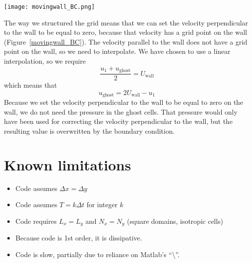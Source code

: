 \documentclass[12pt]{article}
\begin{document}
\begin{center}
\begin{figure*}
\center
\texttt{[image: movingwall\_BC.png]} 
\caption{Schematic of moving wall boundary condition interpolation.}
\label{movingwall_BC}
\end{figure*}
\end{center}

The way we structured the grid means that we can set the velocity perpendicular to the wall to be equal to zero, because that velocity has a grid point on the wall (Figure~\ref{movingwall_BC}).  The velocity parallel to the wall does not have a grid point on the wall, so we need to interpolate. We have chosen to use a linear interpolation, so we require
\[ \frac{u_1 + u_{\mathrm{ghost}}}{2} = U_{\mathrm{wall}}\]
which means that
\begin{equation}
u_{\mathrm{ghost}} = 2U_{\mathrm{wall}} - u_1
\end{equation}
Because we set the velocity perpendicular to the wall to be equal to zero on the wall, we do not need the pressure in the ghost cells.  That pressure would only have been used for correcting the velocity perpendicular to the wall, but the resulting value is overwritten by the boundary condition.

\section{Known limitations}
\begin{itemize}
\item Code assumes $\Delta x=\Delta y$
\item Code assumes $T = k\Delta t$ for integer $k$
\item Code requires $L_x = L_y$ and $N_x = N_y$ (square domains, isotropic cells)
\item Because code is 1st order, it is dissipative.
\item Code is slow, partially due to reliance on Matlab's ``\textbackslash''.
\end{itemize}
\end{document}
